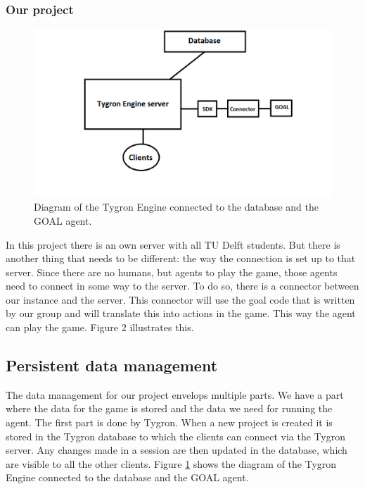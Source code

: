 \subsubsection{Our project}
\begin{figure}[h!]
  \centering
  \includegraphics[scale=0.55]{Tygrondatabase3.png}
  \caption{Diagram of the Tygron Engine connected to the database and the GOAL agent.}
  \label{fig:tygron2}
\end{figure}
In this project there is an own server with all TU Delft students. But there is another thing that needs to be different: the way the connection is set up to that server. Since there are no humans, but agents to play the game, those agents need to connect in some way to the server. To do so, there is a connector between our instance and the server. This connector will use the goal code that is written by our group and will translate this into actions in the game. This way the agent can play the game. Figure 2 illustrates this.

\newpage
\subsection{Persistent data management}
The data management for our project envelops multiple parts. We have a part where the data for the game is stored and the data we need for running the agent. The first part is done by Tygron. When a new project is created it is stored in the Tygron database to which the clients can connect via the Tygron server. Any changes made in a session are then updated in the database, which are visible to all the other clients. Figure \ref{fig:tygron2} shows the diagram of the Tygron Engine connected to the database and the GOAL agent.

